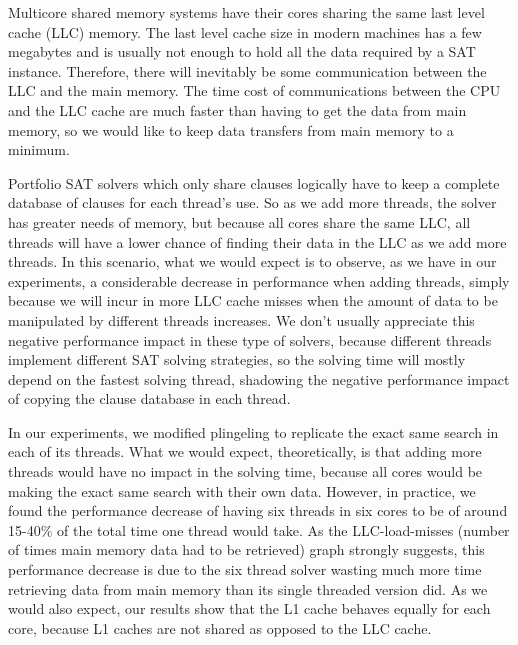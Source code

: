 \documentclass{llncs}
\begin{document}
Multicore shared memory systems have their cores sharing the same last
level cache (LLC) memory. The last level cache size in modern machines
has a few megabytes and is usually not enough to hold all the data
required by a SAT instance. Therefore, there will inevitably be some
communication between the LLC and the main memory. The time cost of
communications between the CPU and the LLC cache are much faster than
having to get the data from main memory, so we would like to keep data
transfers from main memory to a minimum.

Portfolio SAT solvers which only share clauses logically have to keep
a complete database of clauses for each thread's use. So as we add
more threads, the solver has greater needs of memory, but because all
cores share the same LLC, all threads will have a lower chance of
finding their data in the LLC as we add more threads. In this
scenario, what we would expect is to observe, as we have in our
experiments, a considerable decrease in performance when adding
threads, simply because we will incur in more LLC cache misses when
the amount of data to be manipulated by different threads
increases. We don't usually appreciate this negative performance
impact in these type of solvers, because different threads implement
different SAT solving strategies, so the solving time will mostly
depend on the fastest solving thread, shadowing the negative
performance impact of copying the clause database in each thread.


In our experiments, we modified plingeling to replicate the exact same
search in each of its threads. What we would expect, theoretically, is
that adding more threads would have no impact in the solving time,
because all cores would be making the exact same search with their own
data. However, in practice, we found the performance decrease of
having six threads in six cores to be of around 15-40\% of the total
time one thread would take. As the LLC-load-misses (number of times
main memory data had to be retrieved) graph strongly suggests, this
performance decrease is due to the six thread solver wasting much more
time retrieving data from main memory than its single threaded version
did. As we would also expect, our results show that the L1 cache
behaves equally for each core, because L1 caches are not shared as
opposed to the LLC cache.
\end{document}
